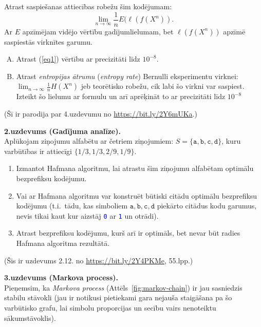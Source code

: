 \documentclass[a4paper]{article}
\begin{document}
Atrast saspiešanas attiecības robežu šim kodējumam:
\begin{equation}
\label{eq1}
\lim_{n \rightarrow \infty} \frac{1}{n} E(\ell(f(X^n)).
\end{equation}
Ar $E$ apzīmējam vidējo vērtību gadījumlielumam, bet
$\ell(f(X^n))$ apzīmē saspiestās virknītes garumu.

\begin{enumerate}[(A)]
\item
Atrast (\ref{eq1}) vērtību ar precizitāti līdz $10^{-8}$.
\item 
Atrast {\em entropijas ātrumu} ({\em entropy rate}) Bernulli eksperimentu virknei:
$\lim_{n \rightarrow \infty} \frac{1}{n} H(X^n)$ jeb teo\-rē\-tis\-ko robežu, cik labi 
šo virkni var saspiest. Izteikt šo lielumu ar formulu un arī aprēķināt to 
ar precizitāti līdz $10^{-8}$
\end{enumerate}

(Šī ir parodija par 4.uzdevumu no \url{https://bit.ly/2Y6mUKa}.)


\vspace{10pt}
{\bf 2.uzdevums (Gadījuma analīze).}\\
Aplūkojam ziņojumu alfabētu ar četriem ziņojumiem: 
$S = \{ \mathtt{a}, \mathtt{b}, \mathtt{c}, \mathtt{d} \}$,
kuru varbūtības ir attiecīgi $\{1/3, 1/3, 2/9, 1/9\}$.
 
\begin{enumerate}
\item Izmantot Hafmana algoritmu, lai atrastu šim ziņojumu alfabētam optimālu bezprefiksu ko\-dē\-ju\-mu.
\item Vai ar Hafmana algoritmu var konstruēt bū\-tis\-ki citādu optimālu bezprefiksu kodējumu 
(t.i.\ tādu, kas simboliem $\mathtt{a}, \mathtt{b}, \mathtt{c}, \mathtt{d}$ 
piekārto citādus kodu garumus, nevis tikai kaut kur aizstāj
\textcolor{blue}{\tt 0} ar \textcolor{blue}{\tt 1} un otrādi). 
\item Atrast bezprefiksu kodējumu, kurš arī ir optimāls, bet nevar būt radies Hafmana algoritma rezultātā.
\end{enumerate}

(Šis ir uzdevums 2.12. no \url{https://bit.ly/2Y4PKMe}, 55.lpp.)


\vspace{10pt}
{\bf 3.uzdevums (Markova process).}\\
Pieņemsim, ka {\em Markova process} (Attēls~\ref{fig:markov-chain}) 
ir jau sasniedzis stabilu stāvokli 
(jau ir notikusi pietiekami gara nejauša staigāšana pa šo varbūtisko grafu, lai 
simbolu proporcijas un secību vairs nenoteiktu sā\-kum\-stā\-vok\-lis). 
\end{document}
